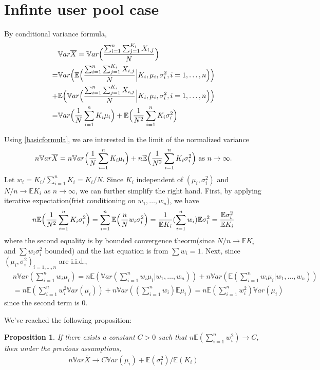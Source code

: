 \documentclass[12pt,letterpaper]{article}
\newcommand{\var}{\ensuremath{\mathbb Var}}
\newcommand{\bbe}{\mathbb{E}}
\newcommand{\xbar}{\overline{X}}
\newtheorem{prop}[thm]{Proposition}
\begin{document}
\section{Infinte user pool case}\label{infcase}
By conditional variance formula, 
\begin{align}
&\var \xbar = \var \Bigl( \frac{\sum_{i=1}^n\sum_{j=1}^{K_i} X_{i,j}}{N} \Bigr) \notag \\
 =& \var  \Bigl( \bbe\Bigl(   \frac{\sum_{i=1}^n\sum_{j=1}^{K_i} X_{i,j}}{N} \Big| K_i,\mu_i,\sigma_i^2,  i=1,\dots,n\Bigr) \Bigr) \\
+&\bbe \Bigl(\var \Bigl( \frac{\sum_{i=1}^n\sum_{j=1}^{K_i} X_{i,j}}{N} \Big | K_i,\mu_i,\sigma_i^2,  i=1,\dots,n\Bigr)\Bigr) \notag\\
=&\var \Bigl(\frac{1}{N}\sum_{i=1}^n K_i \mu_i \Bigr)+\bbe \Bigl(\frac{1}{N^2}\sum_{i=1}^n K_i \sigma^2_i \Bigr)  \label{basicformula}
\end{align}

Using \eqref{basicformula}, we are interested in the limit of the normalized variance 
\[n \var \xbar = n\var \Bigl(\frac{1}{N}\sum_{i=1}^n K_i \mu_i \Bigr)+n\bbe \Bigl(\frac{1}{N^2}\sum_{i=1}^n K_i \sigma^2_i \Bigr) \text{ as } n\to \infty.\]
Let $w_i = K_i/\sum_{i=1}^n K_i = K_i/N$. Since $K_i$ independent of $(\mu_i, \sigma^2_i)$ and $N/n \to \bbe {K_i}$ as $n\to \infty$, we can further simplify the right hand. First, by applying iterative expectation(frist conditioning on $w_1,\dots, w_n$), we have  
\begin{align}
n \bbe \Bigl(\frac{1}{N^2}\sum_{i=1}^n K_i \sigma^2_i \Bigr)  = \sum_{i=1}^n \bbe\Bigl( \frac{n}{N} w_i\sigma^2_i \Bigr) = \frac{1}{\bbe K_i}(\sum_{i=1}^n w_i)\bbe \sigma_i^2 = \frac{\bbe \sigma_i^2}{\bbe K_i} \label{withinterm}
\end{align}
where the second equality is by bounded convergence theorm(since $N/n \to \bbe {K_i}$ and $\sum w_i\sigma^2_i$ bounded) and the last equation is from $\sum w_i=1$. 
Next, since $(\mu_i, \sigma^2_i)_{i=1,\dots, n}$ are i.i.d., 
\begin{align}
&n\var (\sum_{i=1}^n w_i \mu_i) = n\bbe (\var (\sum_{i=1}^n w_i \mu_i|w_1,\dots,w_n))+ n\var (\bbe (\sum_{i=1}^n w_i \mu_i|w_1,\dots,w_n)) \\
&=  n\bbe (\sum_{i=1}^n w_i^2 \var(\mu_i)) + n \var((\sum_{i=1}^n w_i)\bbe\mu_i ) = n\bbe(\sum_{i=1}^n w_i^2) \var (\mu_i) \label {betweenterm}
\end{align}
since the second term is $0$.

We've reached the following proposition:
\begin{prop}\label{prop1}
If there exists a constant $C>0$ such that $n\bbe(\sum_{i=1}^n w_i^2)\to C$, then under the previous assumptions, 
\begin{align}
 n\var\xbar \to C \var(\mu_i) + \bbe(\sigma^2_i)/\bbe (K_i) 
\end{align}
\end{prop}
\end{document}
